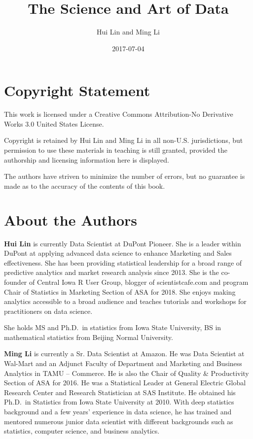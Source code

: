 \documentclass[]{book}
\title{The Science and Art of Data}
\author{Hui Lin and Ming Li}
\date{2017-07-04}
\theoremstyle{definition}
\theoremstyle{definition}
\theoremstyle{remark}
\begin{document}
\maketitle

{
\setcounter{tocdepth}{1}
\tableofcontents
}
\chapter*{Copyright Statement}\label{copyright-statement}

This work is licensed under a Creative Commons Attribution-No Derivative
Works 3.0 United States License.

Copyright is retained by Hui Lin and Ming Li in all non-U.S.
jurisdictions, but permission to use these materials in teaching is
still granted, provided the authorship and licensing information here is
displayed.

The authors have striven to minimize the number of errors, but no
guarantee is made as to the accuracy of the contents of this book.

\chapter*{About the Authors}\label{about-the-authors}

\textbf{Hui Lin} is currently Data Scientist at DuPont Pioneer. She is a
leader within DuPont at applying advanced data science to enhance
Marketing and Sales effectiveness. She has been providing statistical
leadership for a broad range of predictive analytics and market research
analysis since 2013. She is the co-founder of Central Iowa R User Group,
blogger of scientistcafe.com and program Chair of Statistics in
Marketing Section of ASA for 2018. She enjoys making analytics
accessible to a broad audience and teaches tutorials and workshops for
practitioners on data science.

She holds MS and Ph.D.~in statistics from Iowa State University, BS in
mathematical statistics from Beijing Normal University.

\textbf{Ming Li} is currently a Sr. Data Scientist at Amazon. He was
Data Scientist at Wal-Mart and an Adjunct Faculty of Department and
Marketing and Business Analytics in TAMU -- Commerce. He is also the
Chair of Quality \& Productivity Section of ASA for 2016. He was a
Statistical Leader at General Electric Global Research Center and
Research Statistician at SAS Institute. He obtained his Ph.D.~in
Statistics from Iowa State University at 2010. With deep statistics
background and a few years' experience in data science, he has trained
and mentored numerous junior data scientist with different backgrounds
such as statistics, computer science, and business analytics.
\end{document}
